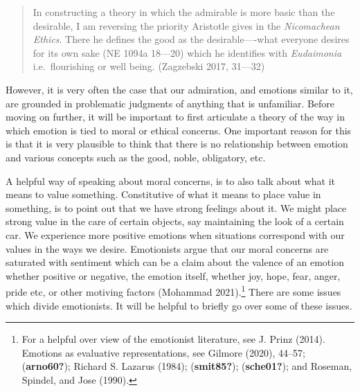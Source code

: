 \documentclass[12pt]{book}
\theoremstyle{definition}
\theoremstyle{remark}
\begin{document}
\begin{quote}
In constructing a theory in which the admirable is more basic than the desirable, I am reversing the priority Aristotle gives in the \emph{Nicomachean Ethics}. There he defines the good as the desirable----what everyone desires for its own sake (NE 1094a 18---20) which he identifies with \emph{Eudaimonia} i.e.~flourishing or well being. (Zagzebski 2017, 31---32)
\end{quote}

However, it is very often the case that our admiration, and emotions similar to it, are grounded in problematic judgments of anything that is unfamiliar. Before moving on further, it will be important to first articulate a theory of the way in which emotion is tied to moral or ethical concerns. One important reason for this is that it is very plausible to think that there is no relationship between emotion and various concepts such as the good, noble, obligatory, etc.

A helpful way of speaking about moral concerns, is to also talk about what it means to value something. Constitutive of what it means to place value in something, is to point out that we have strong feelings about it. We might place strong value in the care of certain objects, say maintaining the look of a certain car. We experience more positive emotions when situations correspond with our values in the ways we desire. Emotionists argue that our moral concerns are saturated with sentiment which can be a claim about the valence of an emotion whether positive or negative, the emotion itself, whether joy, hope, fear, anger, pride etc, or other motiving factors (Mohammad 2021).\footnote{For a helpful over view of the emotionist literature, see J. Prinz (2014). Emotions as evaluative representations, see Gilmore (2020), 44--57; (\textbf{arno60?}); Richard S. Lazarus (1984); (\textbf{smit85?}); (\textbf{sche01?}); and Roseman, Spindel, and Jose (1990).} There are some issues which divide emotionists. It will be helpful to briefly go over some of these issues.
\end{document}

